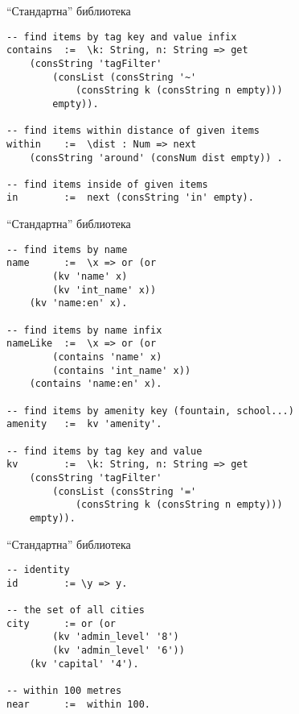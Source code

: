 \documentclass[9pt]{beamer}
\begin{document}
  \begin{frame}[fragile]{``Стандартна'' библиотека}
    \begin{lstwrap}\begin{lstlisting}
-- find items by tag key and value infix
contains  :=  \k: String, n: String => get
    (consString 'tagFilter'
        (consList (consString '~'
            (consString k (consString n empty)))
        empty)).

-- find items within distance of given items
within    :=  \dist : Num => next
    (consString 'around' (consNum dist empty)) .

-- find items inside of given items
in        :=  next (consString 'in' empty).
    \end{lstlisting}\end{lstwrap}
  \end{frame}
  \begin{frame}[fragile]{``Стандартна'' библиотека}
    \begin{lstwrap}\begin{lstlisting}
-- find items by name
name      :=  \x => or (or
        (kv 'name' x)
        (kv 'int_name' x))
    (kv 'name:en' x).

-- find items by name infix
nameLike  :=  \x => or (or
        (contains 'name' x)
        (contains 'int_name' x))
    (contains 'name:en' x).

-- find items by amenity key (fountain, school...)
amenity   :=  kv 'amenity'.

-- find items by tag key and value
kv        :=  \k: String, n: String => get
    (consString 'tagFilter'
        (consList (consString '='
            (consString k (consString n empty)))
    empty)).
    \end{lstlisting}\end{lstwrap}
  \end{frame}
  \begin{frame}[fragile]{``Стандартна'' библиотека}
    \begin{lstwrap}\begin{lstlisting}
-- identity
id        := \y => y.

-- the set of all cities
city      := or (or
        (kv 'admin_level' '8')
        (kv 'admin_level' '6'))
    (kv 'capital' '4').

-- within 100 metres
near      :=  within 100.
    \end{lstlisting}\end{lstwrap}
  \end{frame}
\end{document}
